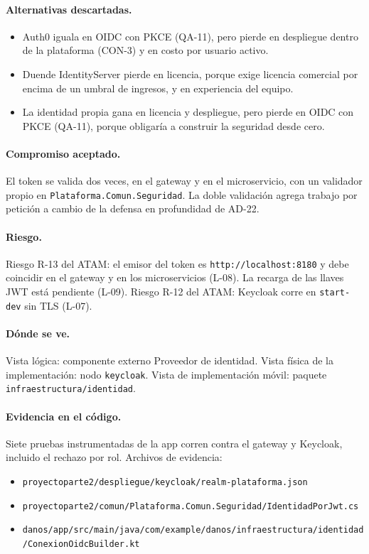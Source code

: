 \paragraph{Alternativas descartadas.}
\begin{itemize}
  \item Auth0 iguala en OIDC con PKCE (QA-11), pero pierde en despliegue dentro de la plataforma (CON-3) y en costo por usuario activo.
  \item Duende IdentityServer pierde en licencia, porque exige licencia comercial por encima de un umbral de ingresos, y en experiencia del equipo.
  \item La identidad propia gana en licencia y despliegue, pero pierde en OIDC con PKCE (QA-11), porque obligaría a construir la seguridad desde cero.
\end{itemize}

\paragraph{Compromiso aceptado.} El token se valida dos veces, en el gateway y en el microservicio, con un validador propio en \texttt{Plataforma.Comun.Seguridad}.
La doble validación agrega trabajo por petición a cambio de la defensa en profundidad de AD-22.

\paragraph{Riesgo.} Riesgo R-13 del ATAM: el emisor del token es \texttt{http://localhost:8180} y debe coincidir en el gateway y en los microservicios (L-08).
La recarga de las llaves JWT está pendiente (L-09).
Riesgo R-12 del ATAM: Keycloak corre en \texttt{start-dev} sin TLS (L-07).

\paragraph{Dónde se ve.} Vista lógica: componente externo Proveedor de identidad.
Vista física de la implementación: nodo \texttt{keycloak}.
Vista de implementación móvil: paquete \texttt{infraestructura/identidad}.

\paragraph{Evidencia en el código.} Siete pruebas instrumentadas de la app corren contra el gateway y Keycloak, incluido el rechazo por rol.
Archivos de evidencia:
{\raggedright
\begin{itemize}
  \item \texttt{proyectoparte2/\br{}despliegue/\br{}keycloak/\br{}realm-plataforma.json}
  \item \texttt{proyectoparte2/\br{}comun/\br{}Plataforma.Comun.Seguridad/\br{}IdentidadPorJwt.cs}
  \item \texttt{danos/\br{}app/\br{}src/\br{}main/\br{}java/\br{}com/\br{}example/\br{}danos/\br{}infraestructura/\br{}identidad/\br{}ConexionOidcBuilder.kt}
\end{itemize}
\par}

